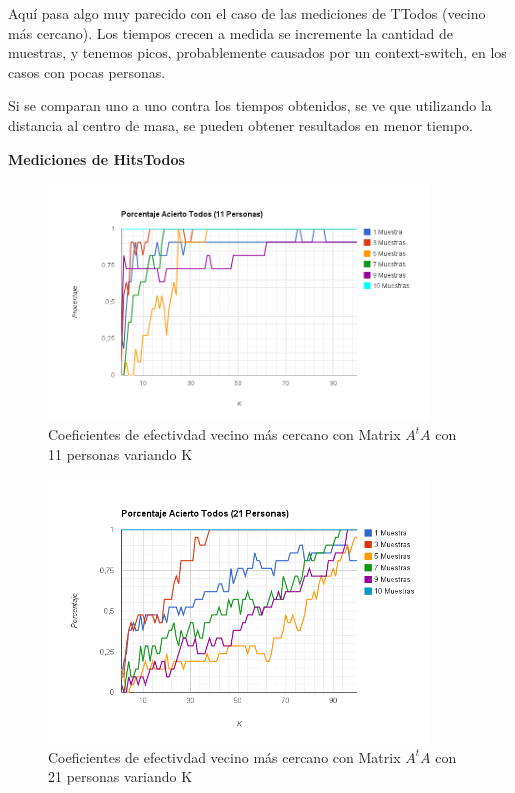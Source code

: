 Aquí pasa algo muy parecido con el caso de las mediciones de TTodos (vecino más cercano). Los
tiempos crecen a medida se incremente la cantidad de muestras, y tenemos picos, probablemente causados por un context-switch, en los
casos con pocas personas.

Si se comparan uno a uno contra los tiempos obtenidos, se ve que utilizando la distancia al centro de masa, se pueden obtener resultados en menor tiempo.

\newpage

\textbf{Mediciones de HitsTodos }

\begin{figure}[H] \includegraphics[width=0.90\textwidth]{img/image10.png} \caption{Coeficientes de
    efectivdad vecino más cercano con Matrix $A^tA$ con 11 personas variando K} \end{figure}

\begin{figure}[H] \includegraphics[width=0.90\textwidth]{img/image11.png} \caption{Coeficientes de
    efectivdad vecino más cercano con Matrix $A^tA$ con 21 personas variando K} \end{figure}

